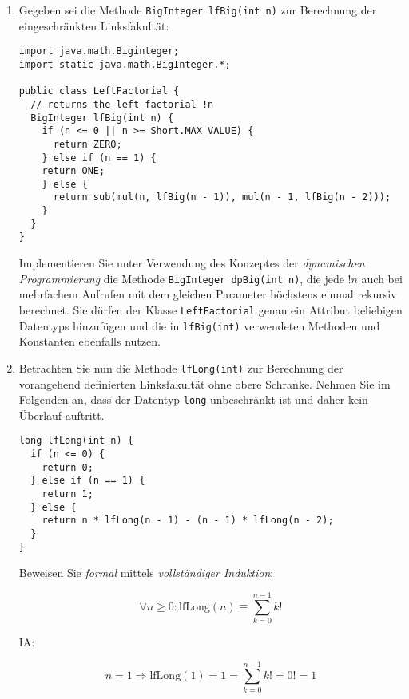 \documentclass{lehramt-informatik}
\begin{document}
\begin{enumerate}
\item Gegeben sei die Methode \verb|BigInteger lfBig(int n)| zur
Berechnung der eingeschränkten Linksfakultät:

\begin{verbatim}
import java.math.Biginteger;
import static java.math.BigInteger.*;

public class LeftFactorial {
  // returns the left factorial !n
  BigInteger lfBig(int n) {
    if (n <= 0 || n >= Short.MAX_VALUE) {
      return ZERO;
    } else if (n == 1) {
    return ONE;
    } else {
      return sub(mul(n, lfBig(n - 1)), mul(n - 1, lfBig(n - 2)));
    }
  }
}
\end{verbatim}

Implementieren Sie unter Verwendung des Konzeptes der \emph{dynamischen
Programmierung} die Methode \verb|BigInteger dpBig(int n)|, die jede
$!n$
auch bei mehrfachem Aufrufen mit dem gleichen Parameter höchstens einmal
rekursiv berechnet. Sie dürfen der Klasse \verb|LeftFactorial| genau ein
Attribut beliebigen Datentyps hinzufügen und die in \verb|lfBig(int)|
verwendeten Methoden und Konstanten ebenfalls nutzen.

\item Betrachten Sie nun die Methode \verb|lfLong(int)| zur Berechnung
der vorangehend definierten Linksfakultät ohne obere Schranke. Nehmen
Sie im Folgenden an, dass der Datentyp \verb|long| unbeschränkt ist und
daher kein Überlauf auftritt.

\begin{verbatim}
long lfLong(int n) {
  if (n <= 0) {
    return 0;
  } else if (n == 1) {
    return 1;
  } else {
    return n * lfLong(n - 1) - (n - 1) * lfLong(n - 2);
  }
}
\end{verbatim}

Beweisen Sie \emph{formal} mittels \emph{vollständiger Induktion}:

\def\lf#1{\text{lfLong}(#1)}
\def\sk#1{\sum^{#1}_{k=0}k!}

\begin{displaymath}
\forall n \geq 0: \lf{n} \equiv \sk{n-1}
\end{displaymath}

\begin{antwort}

IA:

\begin{displaymath}
n=1 \Rightarrow
\lf{1} =
1 =
\sk{n-1} =
0! =
1
\end{displaymath}


\end{antwort}
\end{enumerate}
\end{document}

